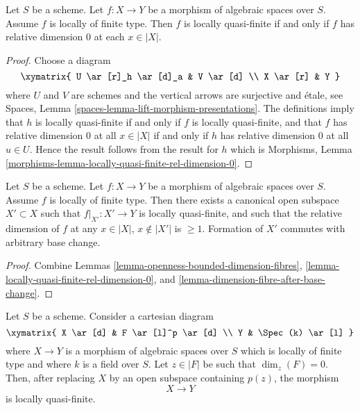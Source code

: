 \begin{lemma}
\label{lemma-locally-quasi-finite-rel-dimension-0}
Let $S$ be a scheme.
Let $f : X \to Y$ be a morphism of algebraic spaces over $S$.
Assume $f$ is locally of finite type.
Then $f$ is locally quasi-finite if and only if $f$ has relative
dimension $0$ at each $x \in |X|$.
\end{lemma}

\begin{proof}
Choose a diagram
$$
\xymatrix{
U \ar[r]_h \ar[d]_a & V \ar[d] \\
X \ar[r] & Y
}
$$
where $U$ and $V$ are schemes and the vertical arrows are surjective and
\'etale, see
Spaces, Lemma \ref{spaces-lemma-lift-morphism-presentations}.
The definitions imply that
$h$ is locally quasi-finite if and only if $f$ is locally quasi-finite,
and that $f$ has relative dimension $0$ at all $x \in |X|$ if and
only if $h$ has relative dimension $0$ at all $u \in U$.
Hence the result follows from the result for $h$ which is
Morphisms, Lemma \ref{morphisms-lemma-locally-quasi-finite-rel-dimension-0}.
\end{proof}

\begin{lemma}
\label{lemma-locally-finite-type-quasi-finite-part}
Let $S$ be a scheme.
Let $f : X \to Y$ be a morphism of algebraic spaces over $S$.
Assume $f$ is locally of finite type.
Then there exists a canonical open subspace $X' \subset X$ such that
$f|_{X'} : X' \to Y$ is locally quasi-finite, and such that the
relative dimension of $f$ at any $x \in |X|$, $x \not \in |X'|$ is
$\geq 1$. Formation of $X'$ commutes with arbitrary base change.
\end{lemma}

\begin{proof}
Combine
Lemmas \ref{lemma-openness-bounded-dimension-fibres},
\ref{lemma-locally-quasi-finite-rel-dimension-0}, and
\ref{lemma-dimension-fibre-after-base-change}.
\end{proof}

\begin{lemma}
\label{lemma-quasi-finite-at-point}
Let $S$ be a scheme. Consider a cartesian diagram
$$
\xymatrix{
X \ar[d] & F \ar[l]^p \ar[d] \\
Y & \Spec(k) \ar[l]
}
$$
where $X \to Y$ is a morphism of algebraic spaces over $S$ which is
locally of finite type and where $k$ is a field over $S$.
Let $z \in |F|$ be such that $\dim_z(F) = 0$. Then, after replacing $X$
by an open subspace containing $p(z)$, the morphism
$$
X \longrightarrow Y
$$
is locally quasi-finite.
\end{lemma}

